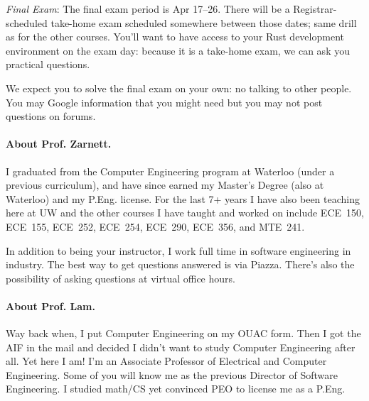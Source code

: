 \documentclass[letterpaper,10pt]{article}
\begin{document}

\textit{Final Exam}: The final exam period is Apr 17--26. There will be a Registrar-scheduled take-home exam scheduled somewhere between those dates; same drill as for the other courses. You'll want to have access to your Rust development environment on the exam day: because it is a take-home exam, we can ask you practical questions.

We expect you to solve the final exam on your own: no talking to other people. You may Google information that you might need but you may not post questions on forums.


\paragraph{About Prof. Zarnett.}
I graduated from the Computer Engineering program at Waterloo (under a previous curriculum), and have since earned my Master's Degree (also at Waterloo) and my P.Eng. license. For the last 7+ years I have also been teaching here at UW and the other courses I have taught and worked on include ECE~150, ECE~155, ECE~252, ECE~254, ECE~290, ECE~356, and MTE~241.

In addition to being your instructor, I work full time in software engineering in industry. The best way to get questions answered is via Piazza. There's also the possibility of asking questions at virtual office hours.

\paragraph{About Prof. Lam.}
Way back when, I put Computer Engineering on my OUAC form. Then I got the AIF in the mail and decided I didn't want to study Computer Engineering after all. Yet here I am! I'm an Associate Professor of Electrical and Computer Engineering. Some of you will know me as the previous Director of Software Engineering. I studied math/CS yet convinced PEO to license me as a P.Eng.
\end{document}
